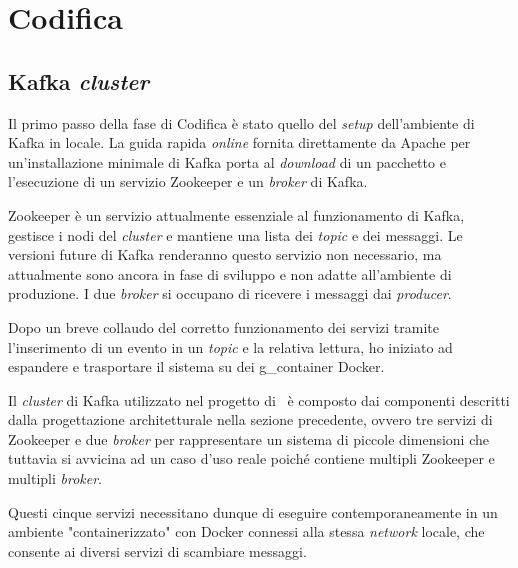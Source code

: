 




\section{Codifica}

\subsection{Kafka \textit{cluster}}

Il primo passo della fase di Codifica è stato quello del \textit{setup} dell'ambiente di Kafka in locale.
La guida rapida \textit{online} fornita direttamente da Apache per un'installazione minimale di Kafka porta al \textit{download} di un pacchetto e l'esecuzione di un servizio Zookeeper e un \textit{broker} di Kafka.

Zookeeper è un servizio attualmente essenziale al funzionamento di Kafka, gestisce i nodi del \textit{cluster} e mantiene una lista dei \textit{topic} e dei messaggi.
Le versioni future di Kafka renderanno questo servizio non necessario, ma attualmente sono ancora in fase di sviluppo e non adatte all'ambiente di produzione.
I due \textit{broker} si occupano di ricevere i messaggi dai \textit{producer}.

Dopo un breve collaudo del corretto funzionamento dei servizi tramite l'inserimento di un evento in un \textit{topic} e la relativa lettura, ho iniziato ad espandere e trasportare il sistema su dei \gls{g_container} Docker.

Il \textit{cluster} di Kafka utilizzato nel progetto di \stage\ è composto dai componenti descritti dalla progettazione architetturale nella sezione precedente, ovvero tre servizi di Zookeeper e due \textit{broker} per rappresentare un sistema di piccole dimensioni che tuttavia si avvicina ad un caso d'uso reale poiché contiene multipli Zookeeper e multipli \textit{broker}.

Questi cinque servizi necessitano dunque di eseguire contemporaneamente in un ambiente "containerizzato" con Docker connessi alla stessa \textit{network} locale, che consente ai diversi servizi di scambiare messaggi.

